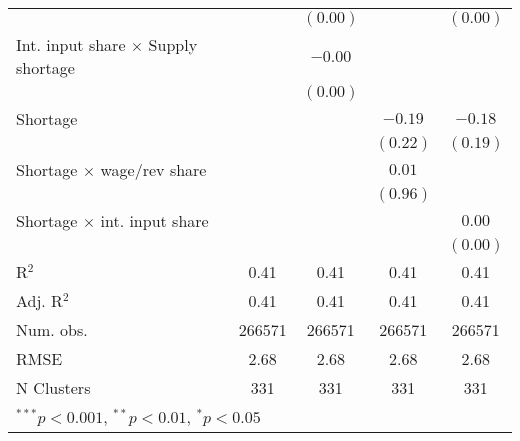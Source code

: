 \begin{tabular}{l c c c c }
                                          &               & $(0.00)$      &               & $(0.00)$      \\
Int. input share $\times$ Supply shortage &               & $-0.00$       &               &               \\
                                          &               & $(0.00)$      &               &               \\
Shortage                                  &               &               & $-0.19$       & $-0.18$       \\
                                          &               &               & $(0.22)$      & $(0.19)$      \\
Shortage $\times$ wage/rev share          &               &               & $0.01$        &               \\
                                          &               &               & $(0.96)$      &               \\
Shortage $\times$ int. input share        &               &               &               & $0.00$        \\
                                          &               &               &               & $(0.00)$      \\
\midrule
R$^2$                                     & 0.41          & 0.41          & 0.41          & 0.41          \\
Adj. R$^2$                                & 0.41          & 0.41          & 0.41          & 0.41          \\
Num. obs.                                 & 266571        & 266571        & 266571        & 266571        \\
RMSE                                      & 2.68          & 2.68          & 2.68          & 2.68          \\
N Clusters                                & 331           & 331           & 331           & 331           \\
\bottomrule
\multicolumn{5}{l}{\tiny{$^{***}p<0.001$, $^{**}p<0.01$, $^*p<0.05$}}
\end{tabular}
